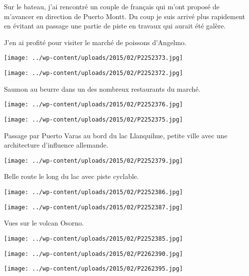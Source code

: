 Sur le bateau, j'ai rencontré un couple de français qui m'ont proposé de m'avancer en direction de Puerto Montt. Du coup je suis arrivé plus rapidement en évitant au passage une partie de piste en travaux qui aurait été galère.

\pagebreak
 J'en ai profité pour visiter le marché de poissons d'Angelmo.
\begin{center} \texttt{[image: ../wp-content/uploads/2015/02/P2252373.jpg]} \end{center}
\begin{center} \texttt{[image: ../wp-content/uploads/2015/02/P2252372.jpg]} \end{center}

\pagebreak
  Saumon au beurre dans un des nombreux restaurants du marché.
\begin{center} \texttt{[image: ../wp-content/uploads/2015/02/P2252376.jpg]} \end{center}
\begin{center} \texttt{[image: ../wp-content/uploads/2015/02/P2252375.jpg]} \end{center}

\pagebreak
  Passage par Puerto Varas au bord du lac Llanquihue, petite ville avec une architecture d'influence allemande.
\begin{center} \texttt{[image: ../wp-content/uploads/2015/02/P2252379.jpg]} \end{center}

Belle route le long du lac avec piste cyclable.
\begin{center} \texttt{[image: ../wp-content/uploads/2015/02/P2252386.jpg]} \end{center}
\begin{center} \texttt{[image: ../wp-content/uploads/2015/02/P2252387.jpg]} \end{center}

 Vues sur le volcan Osorno.
\begin{center} \texttt{[image: ../wp-content/uploads/2015/02/P2252385.jpg]} \end{center}
\begin{center} \texttt{[image: ../wp-content/uploads/2015/02/P2262390.jpg]} \end{center}
\begin{center} \texttt{[image: ../wp-content/uploads/2015/02/P2262395.jpg]} \end{center}

